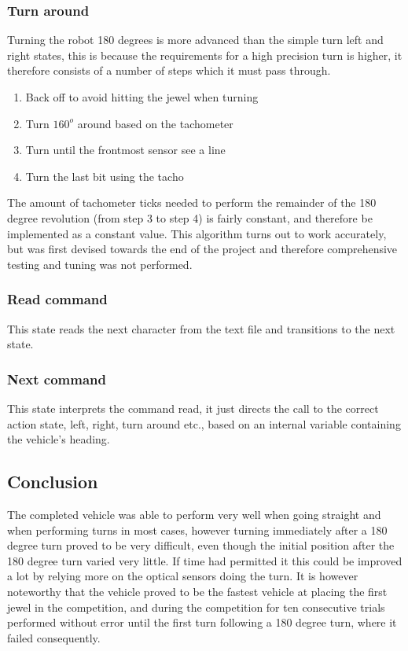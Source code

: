 \documentclass[final, english, a4paper]{article}
\begin{document}
	    \subsubsection{Turn around}
	        Turning the robot 180 degrees is more advanced than the simple turn left and right
	        states, this is because the requirements for a high precision turn is
	        higher, it therefore consists of a number of steps which it must pass
	        through.
	        \begin{enumerate}
	            \item Back off to avoid hitting the jewel when turning
	            \item Turn $160^o$ around based on the tachometer
	            \item Turn until the frontmost sensor see a line
	            \item Turn the last bit using the tacho
	        \end{enumerate}
	        The amount of tachometer ticks needed to perform the remainder of the 180 degree revolution (from step 3 to step 4) is fairly constant, and therefore be implemented as a constant value.
	        This algorithm turns out to work accurately, but was first devised
	         towards the end of the project
	        and therefore comprehensive testing and tuning was not performed.
	    \subsubsection{Read command}
	        This state reads the next character from the text file and 
	        transitions to the next state.
	    \subsubsection{Next command}
	        This state interprets the command read, it just directs the call
	        to the correct action state, left, right, turn around etc., based on 
	        an internal variable containing the vehicle's heading. 

	\subsection{Conclusion} %
	   The completed vehicle was able to perform very well when going straight
	   and when performing turns in most cases, however turning immediately after a
	   180 degree turn proved to be very difficult, even though
	   the initial position after the 180 degree turn varied very little.
       If time had permitted it this could be 
	   improved a lot by relying more on the optical sensors doing the turn.
	   It is however noteworthy that the vehicle proved to be the fastest vehicle
	   at placing the first jewel in the competition, and during the competition for ten consecutive trials
	   performed without error until the first turn following a 180 degree turn, where it failed consequently.
\end{document}
